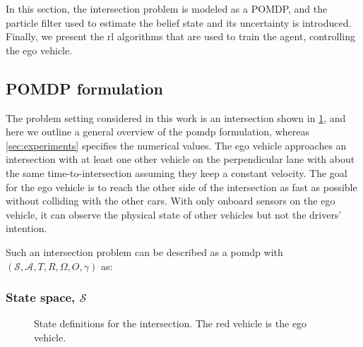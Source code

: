 In this section, the intersection problem is modeled as a POMDP, and the particle filter used to estimate the belief state and its uncertainty is introduced. Finally, we present the \gls{rl} algorithms that are used to train the agent, controlling the ego vehicle.

\subsection{POMDP formulation}
\label{sec:pomdp_formulation}

The problem setting considered in this work is an intersection shown in \ref{fig:states}, and here we outline a general overview of the \gls{pomdp} formulation, whereas \ref{sec:experiments} specifies the numerical values. 
The ego vehicle approaches an intersection with at least one other vehicle on the perpendicular lane with about the same time-to-intersection assuming they keep a constant velocity. The goal for the ego vehicle is to reach the other side of the intersection as fast as possible without colliding with the other cars. With only onboard sensors on the ego vehicle, it can observe the physical state of other vehicles but not the drivers' intention. 

Such an intersection problem can be described as a \gls{pomdp} with \\ $(\mathcal{S},\mathcal{A},T,R,\Omega,O,\gamma)$ as:

\subsubsection{State space, $\mathcal{S}$}
\begin{figure}[!t]
    \centering
        
        \caption{State definitions for the intersection. The red vehicle is the ego vehicle.}
    \label{fig:states}
\end{figure}
%         
%         

